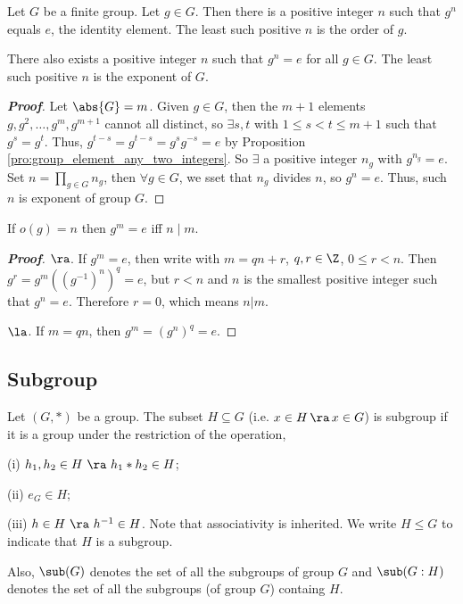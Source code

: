 \begin{proposition}\label{pro:element_order}
Let $G$ be a finite group. Let $g \in G$. Then there is a positive integer $n$ such that $g^n$ equals $e$, the identity element. The least such positive $n$ is the order of $g$.

There also exists a positive integer $n$ such that $g^n = e$ for all $g \in G$. The least such positive $n$ is the exponent of $G$.
\end{proposition}

\begin{proof}[\bf Proof]
Let $\abs{G} = m$. Given $g\in G$, then the $m+1$ elements $g,g^2,\dots, g^m,g^{m+1}$ cannot all distinct, so $\exists s,t$ with $1\leq s<t \leq m +1$ such that $g^s = g^t$. Thus, $g^{t-s} = g^{t-s} = g^{s}g^{-s} = e$ by Proposition \ref{pro:group_element_any_two_integers}. So $\exists$ a positive integer $n_g$ with $g^{n_g} = e$. Set $n = \prod_{g\in G}n_g$, then $\forall g\in G$, we sset that $n_g$ divides $n$, so $g^n = e$. Thus, such $n$ is exponent of group $G$.
\end{proof}



\begin{lemma}\label{lem:order_element}
If $o(g) = n$ then $g^m = e$ iff $n\mid m$.
\end{lemma}

\begin{proof}[\bf Proof]
$\ra$. If $g^m = e$, then write with $m = qn +r$, $q,r\in \Z$, $0\leq r<n$. Then $g^r = g^m((g^{-1})^n)^q =e$, but $r<n$ and $n$ is the smallest positive integer such that $g^n = e$. Therefore $r=0$, which means $n|m$.

$\la$. If $m=qn$, then $g^m = (g^n)^q = e$.
\end{proof}


\subsection{Subgroup}

\begin{definition}\label{def:subgroup}
Let $(G,*)$ be a group. The subset $H\subseteq G$ (i.e. $x\in H \ \! \ra \! \ x\in G$) is subgroup if it is a group under the restriction of the operation,
\ben
\item [(i)] $h_1,h_2 \in H\ \ra\ h_1 * h_2 \in H$;
\item [(ii)] $e_G \in H$;
\item [(iii)] $h\in H\ \ra\ h^{-1}\in H$.
\een
Note that associativity is inherited. We write $H\leq G$ to indicate that $H$ is a subgroup.

Also, $\sub(G)$ denotes the set of all the subgroups of group $G$ and $\sub(G:H)$ denotes the set of all the subgroups (of group $G$) containg $H$. 
\end{definition}

